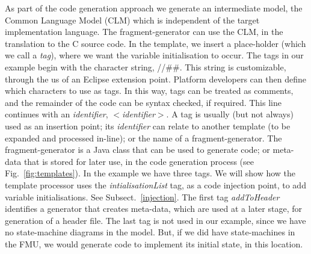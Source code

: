 \documentclass{llncs}%
\begin{document}
As part of the code generation approach we generate an intermediate model, the Common Language Model (CLM) which is independent of the target implementation language. The fragment-generator can use the CLM, in the translation to the C source code.  In the template, we insert a place-holder (which we call a \emph{tag}), where we want the variable initialisation to occur. The tags in our example begin with the character string, //\#\#.  This string is customizable, through the us of an Eclipse extension point. Platform developers can then define which characters to use as tags. In this way, tags can be treated as comments, and the remainder of the code can be syntax checked, if required. This line continues with an \emph{identifier}, $<$\emph{identifier}$>$. A tag is usually (but not always) used as an insertion point; its \emph{identifier} can relate to another template (to be expanded and processed in-line); or the name of a fragment-generator. The fragment-generator is a Java class that can be used to generate code; or meta-data that is stored for later use, in the code generation process  (see Fig.~\ref{fig:templates}). In the example we have three tags. We will show how the template processor uses the \emph{intialisationList} tag, as a code injection point, to add variable initialisations. See Subsect.~\ref{injection}. The first tag \emph{addToHeader} identifies a generator that creates meta-data, which are used at a later stage, for generation of a header file. The last tag is not used in our example, since we have no state-machine diagrams in the model. But, if we did have state-machines in the FMU, we would generate code to implement its initial state, in this location.
%
\end{document}

